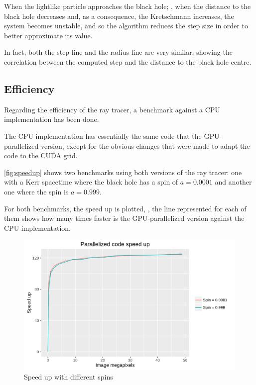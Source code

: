 When the lightlike particle approaches the black hole; \ie, when the distance to the black hole decreases and, as a consequence, the Kretschmann increases, the system becomes unstable, and so the algorithm reduces the step size in order to better approximate its value.

In fact, both the step line and the radius line are very similar, showing the correlation between the computed step and the distance to the black hole centre.

\subsection{Efficiency}

Regarding the efficiency of the ray tracer, a benchmark against a \ac{CPU} implementation has been done.

The \ac{CPU} implementation has essentially the same code that the \ac{GPU}-parallelized version, except for the obvious changes that were made to adapt the code to the \ac{CUDA} grid.

\autoref{fig:speedup} shows two benchmarks using both versions of the ray tracer: one with a Kerr spacetime where the black hole has a spin of $a = 0.0001$ and another one where the spin is $a = 0.999$.

For both benchmarks, the speed up is plotted, \ie, the line represented for each of them shows how many times faster is the \ac{GPU}-parallelized version against the \ac{CPU} implementation.

\begin{figure}[bth]
	\myfloatalign
	\includegraphics[width=1.2\linewidth]{gfx/speedup}
	\caption[Speed up with different spins]{Speed up with different spins}
	\label{fig:speedup}
\end{figure}

